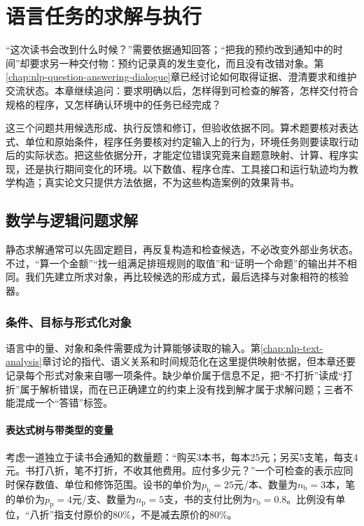 \chapter{语言任务的求解与执行}
\label{chap:nlp-solving-and-execution}

“这次读书会改到什么时候？”需要依据通知回答；“把我的预约改到通知中的时间”却要求另一种交付物：预约记录真的发生变化，而且没有改错对象。第\ref{chap:nlp-question-answering-dialogue}章已经讨论如何取得证据、澄清要求和维护交流状态。本章继续追问：要求明确以后，怎样得到可检查的解答，怎样交付符合规格的程序，又怎样确认环境中的任务已经完成？

这三个问题共用候选形成、执行反馈和修订，但验收依据不同。算术题要核对表达式、单位和原始条件，程序任务要核对约定输入上的行为，环境任务则要读取行动后的实际状态。把这些依据分开，才能定位错误究竟来自题意映射、计算、程序实现，还是执行期间变化的环境。以下数值、程序仓库、工具接口和运行轨迹均为教学构造；真实论文只提供方法依据，不为这些构造案例的效果背书。

\section{数学与逻辑问题求解}
\label{sec:nlp-execution-solving}

静态求解通常可以先固定题目，再反复构造和检查候选，不必改变外部业务状态。不过，“算一个金额”“找一组满足排班规则的取值”和“证明一个命题”的输出并不相同。我们先建立所求对象，再比较候选的形成方式，最后选择与对象相符的核验器。

\subsection{条件、目标与形式化对象}
\label{sec:nlp-execution-formalization}

语言中的量、对象和条件需要成为计算能够读取的输入。第\ref{chap:nlp-text-analysis}章讨论的指代、语义关系和时间规范化在这里提供映射依据，但本章还要记录每个形式对象来自哪一项条件。缺少单价属于信息不足，把“不打折”读成“打折”属于解析错误，而在已正确建立的约束上没有找到解才属于求解问题；三者不能混成一个“答错”标签。

\subsubsection{表达式树与带类型的变量}
\label{sec:nlp-execution-expression}

考虑一道独立于读书会通知的数量题：“购买3本书，每本25元；另买5支笔，每支4元。书打八折，笔不打折，不收其他费用。应付多少元？”一个可检查的表示应同时保存数值、单位和修饰范围。设书的单价为$p_{\mathrm{b}}=25$元/本、数量为$n_{\mathrm{b}}=3$本，笔的单价为$p_{\mathrm{p}}=4$元/支、数量为$n_{\mathrm{p}}=5$支，书的支付比例为$r_{\mathrm{b}}=0.8$。比例没有单位，“八折”指支付原价的80\%，不是减去原价的80\%。


